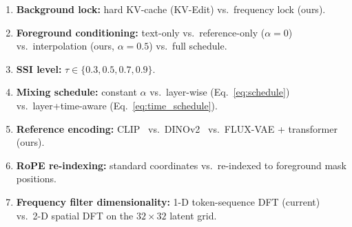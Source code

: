 \begin{enumerate}[nosep]
    \item \textbf{Background lock:} hard KV-cache (KV-Edit) vs.\ frequency lock (ours).
    \item \textbf{Foreground conditioning:} text-only vs.\ reference-only
          ($\alpha=0$) vs.\ interpolation (ours, $\alpha=0.5$) vs.\ full schedule.
    \item \textbf{SSI level:} $\tau \in \{0.3, 0.5, 0.7, 0.9\}$.
    \item \textbf{Mixing schedule:} constant $\alpha$ vs.\ layer-wise
          (Eq.~\ref{eq:schedule}) vs.\ layer+time-aware
          (Eq.~\ref{eq:time_schedule}).
    \item \textbf{Reference encoding:} CLIP~\cite{radford2021clip}
          vs.\ DINOv2~\cite{oquab2023dinov2} vs.\ FLUX-VAE + transformer (ours).
    \item \textbf{RoPE re-indexing:} standard coordinates vs.\ re-indexed to
          foreground mask positions.
    \item \textbf{Frequency filter dimensionality:} 1-D token-sequence DFT (current)
          vs.\ 2-D spatial DFT on the $32\times32$ latent grid.
\end{enumerate}
